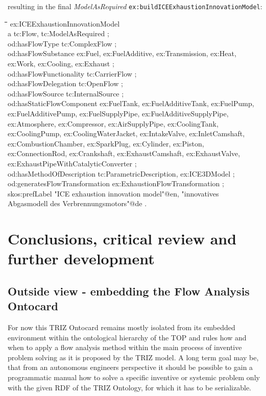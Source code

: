 \documentclass[a4paper,11pt]{article}
\newenvironment{code}{\tt \begin{tabbing}
\hskip12pt\=\hskip12pt\=\hskip12pt\=\hskip12pt\=\hskip5cm\=\hskip5cm\=\kill}
{\end{tabbing}}
\begin{document}
\begin{itemize}
    resulting in the final \emph{ModelAsRequired} 
    \texttt{ex:buildICEExhaustionInnovationModel}:
    \begin{code}
    ex:ICEExhaustionInnovationModel \\
    \> a tc:Flow, tc:ModelAsRequired ; \\
    \> od:hasFlowType tc:ComplexFlow ; \\
    \> od:hasFlowSubstance ex:Fuel, ex:FuelAdditive, ex:Transmission, ex:Heat,  \\
    \> ex:Work, ex:Cooling, ex:Exhaust ; \\
    \> od:hasFlowFunctionality tc:CarrierFlow ; \\
    \> od:hasFlowDelegation tc:OpenFlow ; \\
    \> od:hasFlowSource tc:InternalSource ; \\
    \> od:hasStaticFlowComponent ex:FuelTank, ex:FuelAdditiveTank, ex:FuelPump, \\
    \> ex:FuelAdditivePump, ex:FuelSupplyPipe, ex:FuelAdditiveSupplyPipe, \\
    \> ex:Atmosphere, ex:Compressor, ex:AirSupplyPipe, ex:CoolingTank, \\
    \> ex:CoolingPump, ex:CoolingWaterJacket, ex:IntakeValve, ex:InletCamshaft,\\
    \> ex:CombustionChamber, ex:SparkPlug, ex:Cylinder, ex:Piston, \\
    \> ex:ConnectionRod, ex:Crankshaft, ex:ExhaustCamshaft, ex:ExhaustValve,\\
    \> ex:ExhaustPipeWithCatalyticConverter ; \\
    \> od:hasMethodOfDescription tc:ParametricDescription, ex:ICE3DModel ; \\
    \> od:generatesFlowTransformation ex:ExhaustionFlowTransformation ; \\
    \> skos:prefLabel "ICE exhaustion innovation model"@en, "innovatives  \\
    \> Abgasmodell des Verbrennungsmotors"@de . \\
    \end{code}
    \newpage
    \section{Conclusions, critical review and further development}
        \subsection{Outside view - embedding the Flow Analysis Ontocard}
        For now this TRIZ Ontocard remains mostly isolated from its embedded 
        environment within the ontological hierarchy of the TOP and rules 
        how and when to apply a flow analysis method within the main process 
        of inventive problem solving as it is proposed by the TRIZ model. A 
        long term goal may be, that from an autonomous engineers perspective it
        should be possible to gain a programmatic manual how to solve a 
        specific inventive or systemic problem only with the given RDF of the 
        TRIZ Ontology, for which it has to be serializable.


\end{itemize}
\end{document}
